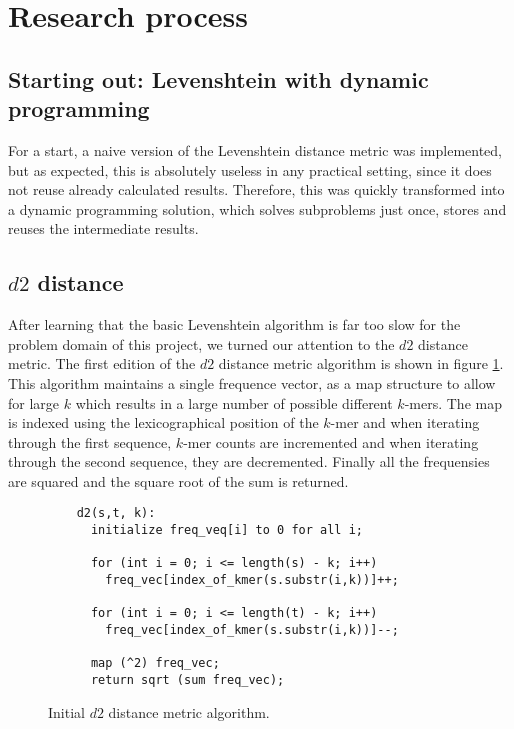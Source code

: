 \section{Research process}
\subsection{Starting out: Levenshtein with dynamic programming}
For a start, a naive version of the Levenshtein distance metric was
implemented, but as expected, this is absolutely useless in any practical
setting, since it does not reuse already calculated results. Therefore, this
was quickly transformed into a dynamic programming solution, which solves
subproblems just once, stores and reuses the intermediate results.

\subsection{$d2$ distance}
After learning that the basic Levenshtein algorithm is far too slow for the
problem domain of this project, we turned our attention to the $d2$ distance
metric. The first edition of the $d2$ distance metric algorithm is shown in
figure \ref{alg:d2}. This algorithm maintains a single frequence vector, as a
map structure to allow for large $k$ which results in a large number of
possible different $k$-mers. The map is indexed using the lexicographical
position of the $k$-mer and when iterating through the first sequence, $k$-mer
counts are incremented and when iterating through the second sequence, they are
decremented. Finally all the frequensies are squared and the square root of the
sum is returned.

\begin{figure}[!h]
  \centering
  \begin{verbatim}
    d2(s,t, k):
      initialize freq_veq[i] to 0 for all i;

      for (int i = 0; i <= length(s) - k; i++)
        freq_vec[index_of_kmer(s.substr(i,k))]++;

      for (int i = 0; i <= length(t) - k; i++)
        freq_vec[index_of_kmer(s.substr(i,k))]--;

      map (^2) freq_vec;
      return sqrt (sum freq_vec);
  \end{verbatim}
  \caption{Initial $d2$ distance metric algorithm.}
  \label{alg:d2}
\end{figure}
